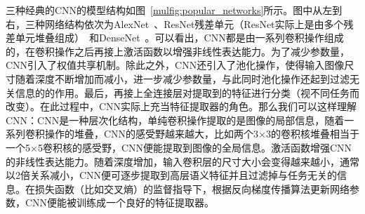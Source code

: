 三种经典的CNN的模型结构如图~\ref{mulfig:popular_networks}所示。图中从左到右，三种网络结构依次为AlexNet~\cite{krizhevsky2012imagenet}、ResNet残差单元（ResNet实际上是由多个残差单元堆叠组成）~\cite{he2016deep, he2016identity}和DenseNet~\cite{huang2017densely}。可以看出，CNN都是由一系列卷积操作组成的，在卷积操作之后再接上激活函数以增强非线性表达能力。为了减少参数量，CNN引入了权值共享机制。除此之外，CNN还引入了池化操作，使得输入图像尺寸随着深度不断增加而减小，进一步减少参数量，与此同时池化操作还起到过滤无关信息的的作用。最后，再接上全连接层对提取到的特征进行分类（视不同任务而改变）。在此过程中，CNN实际上充当特征提取器的角色。那么我们可以这样理解CNN：CNN是一种层次化结构，单纯卷积操作提取的是图像的局部信息，随着一系列卷积操作的堆叠，CNN的感受野越来越大，比如两个3$\times$3的卷积核堆叠相当于一个5$\times$5卷积核的感受野，CNN便能提取到图像的全局信息。激活函数增强CNN的非线性表达能力。随着深度增加，输入卷积层的尺寸大小会变得越来越小，通常以2倍关系减小，CNN便可逐步提取到高层语义特征并且过滤掉与任务无关的信息。在损失函数（比如交叉熵）的监督指导下，根据反向梯度传播算法更新网络参数，CNN便能被训练成一个良好的特征提取器。


